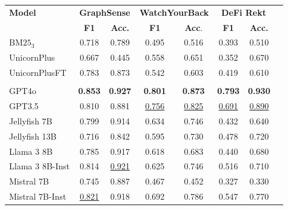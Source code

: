 \begin{tabular*}{\textwidth}{@{\extracolsep{\fill}}lccccccc}
\toprule
\multirow{2}{*}{\textbf{Model}} & \multicolumn{2}{c}{\textbf{GraphSense}} & \multicolumn{2}{c}{\textbf{WatchYourBack}} & \multicolumn{2}{c}{\textbf{DeFi Rekt}} \\
\cmidrule(lr){2-3} \cmidrule(lr){4-5} \cmidrule(lr){6-7}
 & \textbf{F1} & \textbf{Acc.} & \textbf{F1} & \textbf{Acc}. & \textbf{F1} & \textbf{Acc.} \\
\midrule
$\text{BM25}_3$             & 0.718 & 0.789 & 0.495 & 0.516 & 0.393 & 0.510 \\
UnicornPlus                 & 0.667 & 0.445 & 0.558 & 0.651 & 0.352 & 0.670 \\
UnicornPlusFT               & 0.783 & 0.873 & 0.542 & 0.603 & 0.419 & 0.610 \\
\\
GPT4o                       & \textbf{0.853} & \textbf{0.927} & \textbf{0.801} & \textbf{0.873} & \textbf{0.793} & \textbf{0.930} \\
GPT3.5                      & 0.810 & 0.881 & \underline{0.756} & \underline{0.825} & \underline{0.691} & \underline{0.890} \\
Jellyfish 7B                & 0.799 & 0.914 & 0.634 & 0.746 & 0.432 & 0.640 \\
Jellyfish 13B               & 0.716 & 0.842 & 0.595 & 0.730 & 0.478 & 0.720 \\
Llama 3 8B                  & 0.785 & 0.917 & 0.618 & 0.683 & 0.440 & 0.680 \\
Llama 3 8B-Inst             & 0.814 & \underline{0.921} & 0.625 & 0.746 & 0.516 & 0.710 \\
Mistral 7B                  & 0.745 & 0.887 & 0.467 & 0.452 & 0.327 & 0.330 \\
Mistral 7B-Inst             & \underline{0.821} & 0.918 & 0.692 & 0.786 & 0.547 & 0.770 \\
\bottomrule
\end{tabular*}